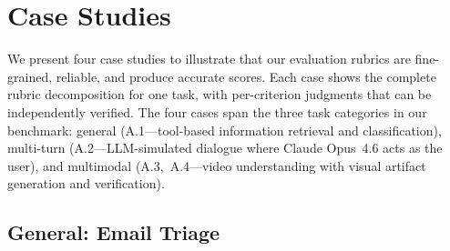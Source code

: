 \documentclass{article}
\begin{document}
\section{Case Studies}
\label{sec:case-studies}

We present four case studies to illustrate that our evaluation rubrics are fine-grained, reliable, and produce accurate scores.  Each case shows the complete rubric decomposition for one task, with per-criterion judgments that can be independently verified.  The four cases span the three task categories in our benchmark: general (A.1---tool-based information retrieval and classification), multi-turn (A.2---LLM-simulated dialogue where Claude Opus~4.6 acts as the user), and multimodal (A.3,~A.4---video understanding with visual artifact generation and verification).

\subsection{General: Email Triage}
\label{sec:case-t002}
\end{document}
